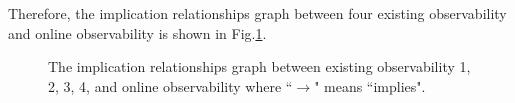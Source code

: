 Therefore, the implication relationships graph between four existing observability and online observability is shown in Fig.\ref{fig:7}.

\begin{figure}[thpb]
      \centering
      
      \caption{The implication relationships graph between existing observability 1, 2, 3, 4, and online observability where ``$\rightarrow$" means ``implies".}
      \label{fig:7}
   \end{figure}

